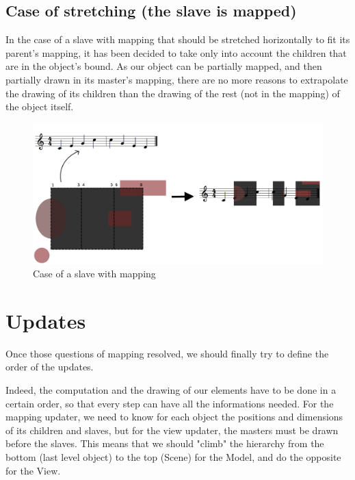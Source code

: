 \documentclass[a4paper]{article}
\begin{document}
\subsection{Case of stretching (the slave is mapped)}\label{subsec:complexMap}

In the case of a slave with mapping that should be stretched horizontally to fit its parent's mapping, it has been decided to take only into account the children that are in the object's bound.
As our object can be partially mapped, and then partially drawn in its master's mapping, there are no more reasons to extrapolate the drawing of its children than the drawing of the rest (not in the mapping) of the object itself.

\begin{figure}[h]
\begin{center}
\includegraphics[width=15cm]{img/withStretchTotal.png}
\caption{Case of a slave with mapping}
\label{fig:mapping2}
\end{center}
\end{figure}

\section{Updates}\label{sec:updates}

Once those questions of mapping resolved, we should finally try to define the order of the updates.

Indeed, the computation and the drawing of our elements have to be done in a certain order, so that every step can have all the informations needed. For the mapping updater, we need to know for each object the positions and dimensions of its children and slaves, but for the view updater, the masters must be drawn before the slaves. This means that we should "climb" the hierarchy from the bottom (last level object) to the top (Scene) for the Model, and do the opposite for the View.
\end{document}
